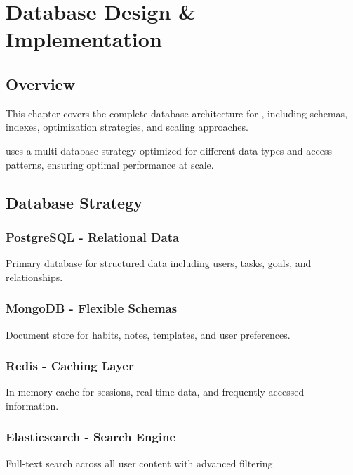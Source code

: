 \chapter{Database Design \& Implementation}
\label{ch:database-design}

\section{Overview}

This chapter covers the complete database architecture for \lifeos{}, including schemas, indexes, optimization strategies, and scaling approaches.

\begin{keypoint}
\lifeos{} uses a multi-database strategy optimized for different data types and access patterns, ensuring optimal performance at scale.
\end{keypoint}

\section{Database Strategy}

\subsection{PostgreSQL - Relational Data}
Primary database for structured data including users, tasks, goals, and relationships.

\subsection{MongoDB - Flexible Schemas}
Document store for habits, notes, templates, and user preferences.

\subsection{Redis - Caching Layer}
In-memory cache for sessions, real-time data, and frequently accessed information.

\subsection{Elasticsearch - Search Engine}
Full-text search across all user content with advanced filtering.


